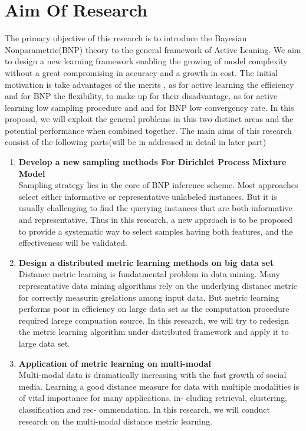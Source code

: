 \section{Aim Of Research}\label{aor}
The primary objective of this research is to introduce the Bayesian Nonparametric(BNP) theory to the general framework of Active Leaning. We aim to design a new learning framework enabling the growing of model complexity without a great compromising in accuracy and a growth in cost.
The initial motivation is take advantages of the merits , as for active learning the efficiency and for BNP the flexibility, to make up for their disadvantage, as for active learning low sampling procedure and and for BNP low convergency rate\cite{gershman2012tutorial,escobar1995bayesian,Settles2010}. In this proposal, we will exploit the general problems in this two distinct areas and the  potential performance when combined together.  The main aims of this research consist of the following parts(will be in addressed in detail in later part) 
\begin{enumerate}
\item{\textbf{Develop a new sampling methods For Dirichlet Process Mixture Model}}\\
 Sampling strategy lies in the core of BNP inference scheme. Most approaches select either informative or representative unlabeled instances. But it is usually challenging to find the querying instances that are both informative and representative. Thus in this research, a new approach is to be proposed to provide a systematic way to select samples having both features, and the effectiveness will be validated.
 
\item{\textbf{Design a distributed metric learning methods on big data set }}\\

Distance metric learning is fundatmental problem in data mining. Many representative data mining algorithms rely on the underlying distance metric for correctly measurin grelations among input data. But metric learning performs poor in efficiency on large data set as the computation procedure required larege compuation source. In this research, we will try to redesign the metric learning algorithm under distributed framework and apply it to large data set.

\item{\textbf{Application of metric learning on multi-modal }}\\

Multi-modal data is dramatically increasing with the fast growth of social media. Learning a good distance measure for data with multiple modalities is of vital importance for many applications, in- cluding retrieval, clustering, classification and rec- ommendation. In this research, we will conduct research on the multi-modal distance metric learning.

 
\end{enumerate}

